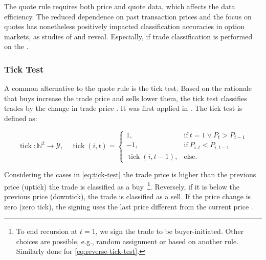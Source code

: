 The quote rule requires both price and quote data, which affects the data efficiency. The reduced dependence on past transaction prices and the focus on quotes has nonetheless positively impacted classification accuracies in option markets, as studies of \textcite[][886]{savickasInferringDirectionOption2003} and \textcite[][3]{grauerOptionTradeClassification2022} reveal. Especially, if trade classification is performed on the .


\subsubsection{Tick Test}\label{sec:tick-test}

A common alternative to the quote rule is the tick test. Based on the rationale that buys increase the trade price and sells lower them, the tick test classifies trades by the change in trade price \autocite[][271]{easleyDiscerningInformationTrade2016}. It was first applied in \textcites[][244]{holthausenEffectLargeBlock1987}[][240]{hasbrouckTradesQuotesInventories1988}. The tick test is defined as:

\begin{equation}
    \operatorname{tick}\colon \mathbb{N}^2 \to \mathcal{Y},\quad
    \operatorname{tick}(i, t)=
    \begin{cases}
        1,                           & \text{if}\ t=1 \lor P_{t}>P_{t-1} \\
        -1,                          & \text{if}\ P_{i, t} < P_{i, t-1}  \\
        \operatorname{tick}(i, t-1), & \text{else}.
    \end{cases}
    \label{eq:tick-test}
\end{equation}

Considering the cases in \cref{eq:tick-test} the trade price is higher than the previous price (uptick) the trade is classified as a buy~\footnote{To end recursion at $t=1$, we sign the trade to be buyer-initiated. Other choices are possible, e.g., random assignment or based on another rule. Similarly done for \cref{eq:reverse-tick-test}.}. Reversely, if it is below the previous price (downtick), the trade is classified as a sell. If the price change is zero (zero tick), the signing uses the last price different from the current price \autocite[][3]{leeInferringTradeDirection1991}.

